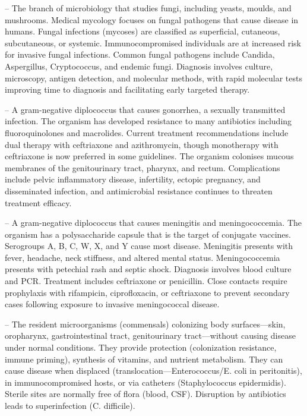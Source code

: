 -- The branch of microbiology that studies fungi, including yeasts, moulds, and mushrooms. Medical mycology focuses on fungal pathogens that cause disease in humans. Fungal infections (mycoses) are classified as superficial, cutaneous, subcutaneous, or systemic. Immunocompromised individuals are at increased risk for invasive fungal infections. Common fungal pathogens include Candida, Aspergillus, Cryptococcus, and endemic fungi. Diagnosis involves culture, microscopy, antigen detection, and molecular methods, with rapid molecular tests improving time to diagnosis and facilitating early targeted therapy.

-- A gram-negative diplococcus that causes gonorrhea, a sexually transmitted infection. The organism has developed resistance to many antibiotics including fluoroquinolones and macrolides. Current treatment recommendations include dual therapy with ceftriaxone and azithromycin, though monotherapy with ceftriaxone is now preferred in some guidelines. The organism colonises mucous membranes of the genitourinary tract, pharynx, and rectum. Complications include pelvic inflammatory disease, infertility, ectopic pregnancy, and disseminated infection, and antimicrobial resistance continues to threaten treatment efficacy.

-- A gram-negative diplococcus that causes meningitis and meningococcemia. The organism has a polysaccharide capsule that is the target of conjugate vaccines. Serogroups A, B, C, W, X, and Y cause most disease. Meningitis presents with fever, headache, neck stiffness, and altered mental status. Meningococcemia presents with petechial rash and septic shock. Diagnosis involves blood culture and PCR. Treatment includes ceftriaxone or penicillin. Close contacts require prophylaxis with rifampicin, ciprofloxacin, or ceftriaxone to prevent secondary cases following exposure to invasive meningococcal disease.

-- The resident microorganisms (commensals) colonizing body surfaces—skin, oropharynx, gastrointestinal tract, genitourinary tract—without causing disease under normal conditions. They provide protection (colonization resistance, immune priming), synthesis of vitamins, and nutrient metabolism. They can cause disease when displaced (translocation—Enterococcus/E. coli in peritonitis), in immunocompromised hosts, or via catheters (Staphylococcus epidermidis). Sterile sites are normally free of flora (blood, CSF). Disruption by antibiotics leads to superinfection (C. difficile).

